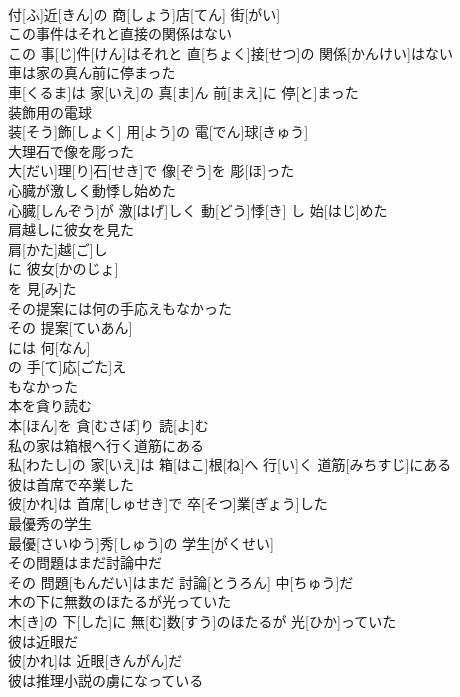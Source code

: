 \documentclass[8pt]{extreport}
\begin{document}
\begin{CJK}{UTF8}{min}
\\	付[ふ]近[きん]の 商[しょう]店[てん] 街[がい]
\\	この事件はそれと直接の関係はない	
\\	この 事[じ]件[けん]はそれと 直[ちょく]接[せつ]の 関係[かんけい]はない
\\	車は家の真ん前に停まった	
\\	車[くるま]は 家[いえ]の 真[ま]ん 前[まえ]に 停[と]まった
\\	装飾用の電球	
\\	装[そう]飾[しょく] 用[よう]の 電[でん]球[きゅう]
\\	大理石で像を彫った	
\\	大[だい]理[り]石[せき]で 像[ぞう]を 彫[ほ]った
\\	心臓が激しく動悸し始めた	
\\	心臓[しんぞう]が 激[はげ]しく 動[どう]悸[き] し 始[はじ]めた
\\	肩越しに彼女を見た	
\\	肩[かた]越[ご]し 
\\	に 彼女[かのじょ]
\\	を 見[み]た 
\\	その提案には何の手応えもなかった	
\\	その 提案[ていあん]
\\	には 何[なん]
\\	の 手[て]応[ごた]え 
\\	もなかった
\\	本を貪り読む	
\\	本[ほん]を 貪[むさぼ]り 読[よ]む
\\	私の家は箱根へ行く道筋にある	
\\	私[わたし]の 家[いえ]は 箱[はこ]根[ね]へ 行[い]く 道筋[みちすじ]にある
\\	彼は首席で卒業した	
\\	彼[かれ]は 首席[しゅせき]で 卒[そつ]業[ぎょう]した
\\	最優秀の学生	
\\	最優[さいゆう]秀[しゅう]の 学生[がくせい]
\\	その問題はまだ討論中だ	
\\	その 問題[もんだい]はまだ 討論[とうろん] 中[ちゅう]だ
\\	木の下に無数のほたるが光っていた	
\\	木[き]の 下[した]に 無[む]数[すう]のほたるが 光[ひか]っていた
\\	彼は近眼だ	
\\	彼[かれ]は 近眼[きんがん]だ
\\	彼は推理小説の虜になっている	

\end{CJK}
\end{document}
